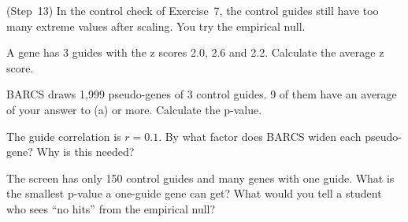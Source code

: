 \begin{exlist}[resume*=ex2]
\item \tagcalc{} \tagexplain{} \tagdecide{} (Step~13) In the control check of
Exercise~7, the control guides still have too many extreme values after
scaling. You try the empirical null.
\begin{parts}
\item A gene has 3 guides with the z scores 2.0, 2.6 and 2.2. Calculate the
  average z score.
\item BARCS draws 1{,}999 pseudo-genes of 3 control guides. 9 of them have
  an average of your answer to (a) or more. Calculate the p-value.
\item The guide correlation is $r = 0.1$. By what factor does BARCS widen
  each pseudo-gene? Why is this needed?
\item The screen has only 150 control guides and many genes with one guide.
  What is the smallest p-value a one-guide gene can get? What would you
  tell a student who sees ``no hits'' from the empirical null?
\end{parts}
\end{exlist}

